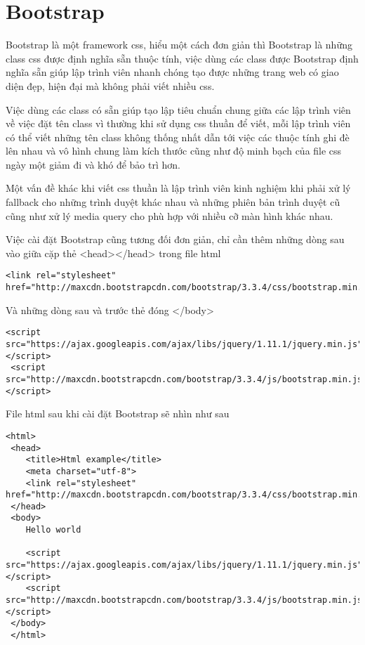 \section{Bootstrap}
Bootstrap là một framework css, hiểu một cách đơn giản thì Bootstrap là những class css được định nghĩa sẵn thuộc tính, việc dùng các class được Bootstrap định nghĩa sẵn giúp lập trình viên nhanh chóng tạo được những trang web có giao diện đẹp, hiện đại mà không phải viết nhiều css.\par
Việc dùng các class có sẵn giúp tạo lập tiêu chuẩn chung giữa các lập trình viên về việc đặt tên class vì thường khi sử dụng css thuần để viết, mỗi lập trình viên có thể viết những tên class không thống nhất dẫn tới việc các thuộc tính ghi đè lên nhau và vô hình chung làm kích thước cũng như độ minh bạch của file css ngày một giảm đi và khó để bảo trì hơn.\par
Một vấn đề khác khi viết css thuần là lập trình viên kinh nghiệm khi phải xử lý fallback cho những trình duyệt khác nhau và những phiên bản trình duyệt cũ cũng như xử lý media query cho phù hợp với nhiều cỡ màn hình khác nhau.\par
Việc cài đặt Bootstrap cũng tương đối đơn giản, chỉ cần thêm những dòng sau vào giữa cặp thẻ <head></head> trong file html

\lstset{language=Html}
\vspace{-1em}
\begin{lstlisting}[frame=single]
 <link rel="stylesheet" href="http://maxcdn.bootstrapcdn.com/bootstrap/3.3.4/css/bootstrap.min.css">
\end{lstlisting}

Và những dòng sau và trước thẻ đóng </body>

\vspace{-1em}
\begin{lstlisting}[frame=single]
 <script src="https://ajax.googleapis.com/ajax/libs/jquery/1.11.1/jquery.min.js"></script>
 <script src="http://maxcdn.bootstrapcdn.com/bootstrap/3.3.4/js/bootstrap.min.js"></script>
\end{lstlisting}

File html sau khi cài đặt Bootstrap sẽ nhìn như sau

\begin{center}
	\vspace{-2em}
	\begin{lstlisting}[frame=single]
 <html>
 <head>
    <title>Html example</title>
    <meta charset="utf-8">
    <link rel="stylesheet" href="http://maxcdn.bootstrapcdn.com/bootstrap/3.3.4/css/bootstrap.min.css">
 </head>
 <body>
    Hello world

    <script src="https://ajax.googleapis.com/ajax/libs/jquery/1.11.1/jquery.min.js"></script>
    <script src="http://maxcdn.bootstrapcdn.com/bootstrap/3.3.4/js/bootstrap.min.js"></script>
 </body>
 </html>
\end{lstlisting}
	\vspace{-1.5em}
\end{center}

